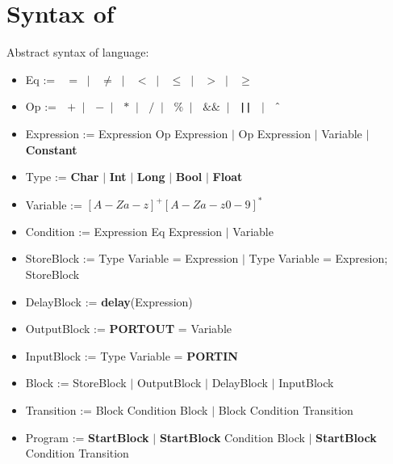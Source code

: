 \section{Syntax of \plcchart}
\label{sec:statechartsyn}

Abstract syntax of \plcchart language:
\begin{definition}
\plcchart

\begin{itemize}
	\item Eq := $\;$ \boldmath$=$\unboldmath $\; \mid \;$ \boldmath$\neq$\unboldmath $\; \mid \;$ \boldmath$<$\unboldmath $\; \mid \;$ \boldmath$\leq$\unboldmath $\; \mid \;$ \boldmath$>$\unboldmath $\; \mid \;$ \boldmath$\geq$\unboldmath	
	\item Op := $\;$ \boldmath$+$\unboldmath $\; \mid \;$ \boldmath$-$\unboldmath $\; \mid \;$ \boldmath$*$\unboldmath $\; \mid \;$ \boldmath$/$\unboldmath $\; \mid \;$ \boldmath$\%$\unboldmath $\; \mid \;$ \boldmath$\&\&$\unboldmath $\; \mid \;$ \textbf{\texttt{||}} $\; \mid \;$ \boldmath$\mathbin{\char`\^}$\unboldmath

	\item Expression := Expression Op Expression $\mid$ Op Expression $\mid$ Variable $\mid$ \textbf{Constant}
	
	\item Type := \textbf{Char} $\mid$ \textbf{Int} $\mid$ \textbf{Long} $\mid$ \textbf{Bool} $\mid$ \textbf{Float}
	\item Variable := $[A-Za-z]^+[A-Za-z0-9]^*$

	\item Condition := Expression Eq Expression $\mid$ Variable

		
	\item StoreBlock := Type Variable = Expression $\mid$ Type Variable = Expresion; StoreBlock
	\item DelayBlock := \textbf{delay}(Expression)
	\item OutputBlock := \textbf{PORTOUT} = Variable
	\item InputBlock := Type Variable = \textbf{PORTIN}
	\item Block := StoreBlock $\mid$ OutputBlock $\mid$ DelayBlock $\mid$ InputBlock

	
	\item Transition := Block Condition Block $\mid$ Block Condition Transition
	
	\item Program := \textbf{StartBlock} $\mid$ \textbf{StartBlock} Condition Block $\mid$ \textbf{StartBlock} Condition Transition
\end{itemize}
\end{definition}

